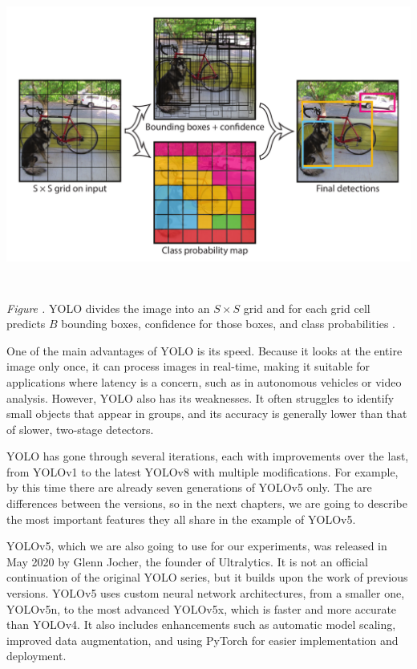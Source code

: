 \documentclass[14pt,a4paper]{extarticle}
\newcounter{e}
\newcounter{pic}
\newcommand{\pic}[1]{\refstepcounter{pic} \vspace{-0.3cm}\textit{Figure \arabic{pic}\label{#1}.}}
\newcounter{tabl}
\numberwithin{equation}{section}
\numberwithin{figure}{section}
\begin{document}
\begin{center}
    \includegraphics[height=10cm]{images/yolo-grid.png}
\end{center}
\begin{center}
    \pic{yolo-grid} YOLO divides the image
    into an $S \times S$ grid and for each grid cell predicts $B$ bounding boxes, confidence for those boxes, and class probabilities \cite{yolov1}.
\end{center}


One of the main advantages of YOLO is its speed. Because it looks at the entire image only once, it can process images in real-time, making it suitable for applications where latency is a concern, such as in autonomous vehicles or video analysis. However, YOLO also has its weaknesses. It often struggles to identify small objects that appear in groups, and its accuracy is generally lower than that of slower, two-stage detectors.

YOLO has gone through several iterations, each with improvements over the last, from YOLOv1 to the latest YOLOv8 \cite{yolo-overview} with multiple modifications. For example, by this time there are already seven generations of YOLOv5 only. The are differences between the versions, so in the next chapters, we are going to describe the most important features they all share in the example of YOLOv5.

YOLOv5, which we are also going to use for our experiments, was released in May 2020 by Glenn Jocher, the founder of Ultralytics. It is not an official continuation of the original YOLO series, but it builds upon the work of previous versions. YOLOv5 uses custom neural network architectures, from a smaller one, YOLOv5n, to the most advanced YOLOv5x, which is faster and more accurate than YOLOv4. It also includes enhancements such as automatic model scaling, improved data augmentation, and using PyTorch for easier implementation and deployment.
\end{document}
